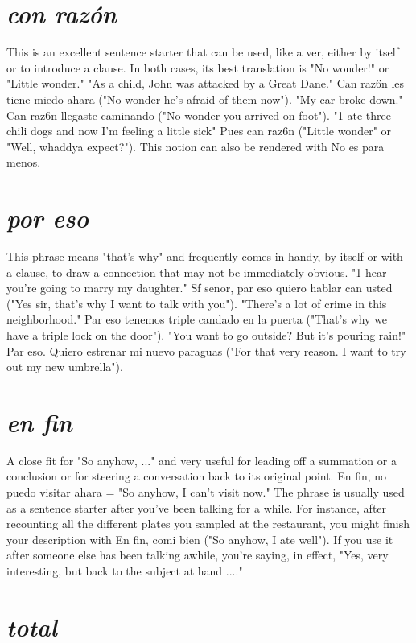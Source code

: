 \documentclass[14pt,a4paper,oneside]{memoir}
\begin{document}
\section{\emph{con razón}}

This is an excellent sentence starter that can be used, like
a ver, either by itself or to introduce a clause. In both cases, its best
translation is "No wonder!" or "Little wonder." "As a child, John was
attacked by a Great Dane." Can raz6n les tiene miedo ahara ("No
wonder he's afraid of them now"). "My car broke down." Can raz6n
llegaste caminando ("No wonder you arrived on foot"). "1 ate three
chili dogs and now I'm feeling a little sick" Pues can raz6n ("Little
wonder" or "Well, whaddya expect?"). This notion can also be rendered
with No es para menos.

\section{\emph{por eso}}

This phrase means "that's why" and frequently comes in
handy, by itself or with a clause, to draw a connection that may not be
immediately obvious. "1 hear you're going to marry my daughter." Sf
senor, par eso quiero hablar can usted ("Yes sir, that's why I want to
talk with you"). "There's a lot of crime in this neighborhood." Par eso
tenemos triple candado en la puerta ("That's why we have a triple
lock on the door"). "You want to go outside? But it's pouring rain!" Par
eso. Quiero estrenar mi nuevo paraguas ("For that very reason. I want
to try out my new umbrella").

\section{\emph{en fin}}

A close fit for "So anyhow, ..." and very useful for leading off
a summation or a conclusion or for steering a conversation back to its
original point. En fin, no puedo visitar ahara = "So anyhow, I can't
visit now." The phrase is usually used as a sentence starter after you've
been talking for a while. For instance, after recounting all the different
plates you sampled at the restaurant, you might finish your description
with En fin, comi bien ("So anyhow, I ate well"). If you use it after
someone else has been talking awhile, you're saying, in effect, "Yes,
very interesting, but back to the subject at hand ...."

\section{\emph{total}}
\end{document}
